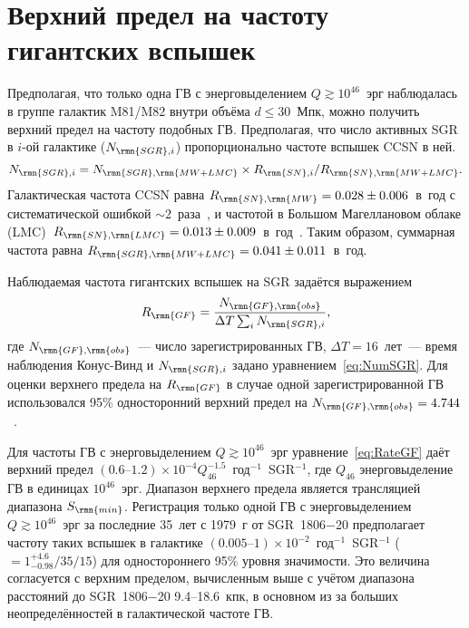 \section{Верхний предел на частоту гигантских вспышек}
Предполагая, что только одна ГВ с энерговыделением $Q \gtrsim 10^{46}$~эрг наблюдалась 
в группе галактик M81/M82 внутри объёма $d \le 30$~Мпк, можно получить верхний предел 
на частоту подобных ГВ. Предполагая, что число активных SGR в $i$-ой галактике ($N_{\rmn{SGR},i}$)
пропорционально частоте вспышек CCSN в ней.
\begin{equation}\label{eq:NumSGR}
N_{\rmn{SGR},i} = N_{\rmn{SGR}, \rmn{MW+LMC}} \times R_{\rmn{SN},i} 
  / R_{\rmn{SN}, \rmn{MW+LMC}} .
\end{equation}
Галактическая частота CCSN равна $R_{\rmn{SN}, \rmn{MW}} = 0.028\pm0.006$~в~год 
с систематической ошибкой $\sim 2$~раза~\citep{Li2011part3}, и частотой в Большом 
Магеллановом облаке (LMC)~$R_{\rmn{SN}, \rmn{LMC}} = 0.013\pm0.009$~в~год~\citep{Bergh1991}. 
Таким образом, суммарная частота равна $R_{\rmn{SGR}, \rmn{MW+LMC}} = 0.041\pm0.011$~в~год. 

Наблюдаемая частота гигантских вспышек на SGR задаётся выражением
\begin{equation}\label{eq:RateGF}
R_{\rmn{GF}} = \frac{N_{\rmn{GF},\rmn{obs}}}{\Delta T \sum_{i} N_{\rmn{SGR}, i}} ,
\end{equation}
где $N_{\rmn{GF},\rmn{obs}}$~--- число зарегистрированных ГВ, 
$\Delta T=16$~лет~--- время наблюдения Конус-Винд и $N_{\rmn{SGR}, i}$ 
задано уравнением~\ref{eq:NumSGR}. Для оценки верхнего предела на $R_{\rmn{GF}}$ 
в случае одной зарегистрированной ГВ использовался 95\% односторонний верхний предел
на $N_{\rmn{GF}, \rmn{obs}}=4.744$~\citep{Gehrels1986}.

Для частоты ГВ с энерговыделением $Q \gtrsim 10^{46}$~эрг уравнение~\ref{eq:RateGF} 
даёт верхний предел ${(0.6\textrm{--}1.2)\times 10^{-4} Q_{46}^{-1.5}}$~год$^{-1}$~SGR$^{-1}$, 
где $Q_{46}$ энерговыделение ГВ в единицах $10^{46}$~эрг. Диапазон верхнего предела 
является трансляцией диапазона $S_{\rmn{min}}$.  Регистрация только 
одной ГВ с энерговыделением $Q \gtrsim 10^{46}$~эрг за последние 35~лет 
с 1979~г от SGR~1806$-$20 предполагает частоту таких вспышек в галактике 
${(0.005\textrm{--}1)\times 10^{-2}}$~год$^{-1}$~SGR$^{-1}$ ($=1_{-0.98}^{+4.6} / 35 / 15 $) 
для одностороннего 95\% уровня значимости. Это величина согласуется с верхним пределом, 
вычисленным выше с учётом диапазона расстояний до SGR~1806$-$20 9.4--18.6~кпк, 
в основном из за больших неопределённостей в галактической частоте ГВ. 

